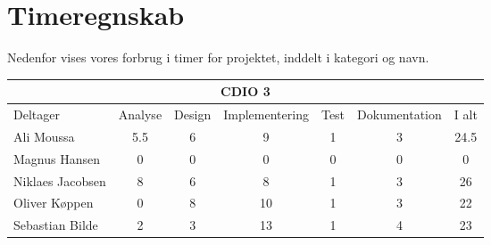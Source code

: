 \chapter*{Timeregnskab}

Nedenfor vises vores forbrug i timer for projektet, inddelt i kategori og navn.

\begin{table}[h]
    \centering
        \begin{tabular}{|l|c|c|c|c|c|c|}
                \hline
            \multicolumn{7}{|c|}{CDIO 3}
            \\ \hline
                    Deltager         &  Analyse  &  Design  &  Implementering  &  Test  &  Dokumentation  &  I alt
            \\ \hline
                    Ali Moussa       &    5.5      &    6     &        9         &    1   &        3        &    24.5
            \\ \hline
                    Magnus Hansen    &    0      &    0     &        0         &    0   &        0        &    0
            \\ \hline
                    Niklaes Jacobsen &    8      &    6     &        8         &    1   &        3        &    26
            \\ \hline
                    Oliver Køppen    &    0      &    8     &        10        &    1   &        3        &    22
            \\ \hline
                    Sebastian Bilde  &    2      &    3     &        13         &    1   &        4        &   23
            \\ \hline
        \end{tabular}
\end{table}